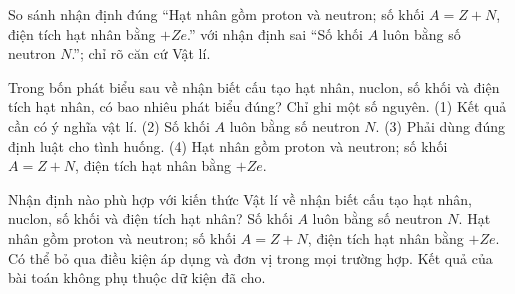 \begin{bt}
So sánh nhận định đúng “Hạt nhân gồm proton và neutron; số khối $A=Z+N$, điện tích hạt nhân bằng $+Ze$.” với nhận định sai “Số khối $A$ luôn bằng số neutron $N$.”; chỉ rõ căn cứ Vật lí.
\end{bt}

\begin{ex}
Trong bốn phát biểu sau về nhận biết cấu tạo hạt nhân, nuclon, số khối và điện tích hạt nhân, có bao nhiêu phát biểu đúng? Chỉ ghi một số nguyên. (1) Kết quả cần có ý nghĩa vật lí. (2) Số khối $A$ luôn bằng số neutron $N$. (3) Phải dùng đúng định luật cho tình huống. (4) Hạt nhân gồm proton và neutron; số khối $A=Z+N$, điện tích hạt nhân bằng $+Ze$.
\end{ex}

\begin{ex}
Nhận định nào phù hợp với kiến thức Vật lí về nhận biết cấu tạo hạt nhân, nuclon, số khối và điện tích hạt nhân?
\choice
{Số khối $A$ luôn bằng số neutron $N$.}
{\True Hạt nhân gồm proton và neutron; số khối $A=Z+N$, điện tích hạt nhân bằng $+Ze$.}
{Có thể bỏ qua điều kiện áp dụng và đơn vị trong mọi trường hợp.}
{Kết quả của bài toán không phụ thuộc dữ kiện đã cho.}
\end{ex}

